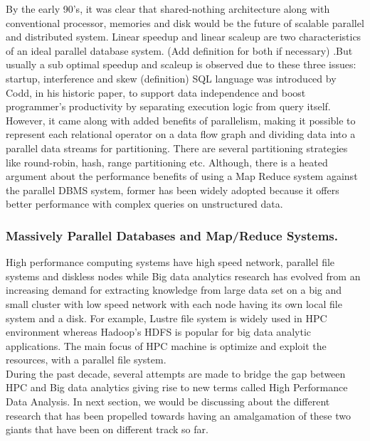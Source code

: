 \documentclass[runningheads,a4paper]{llncs}
\begin{document}
By the early 90's, it was clear that shared-nothing architecture along with conventional processor, memories and disk would be the future of scalable parallel and distributed system. Linear speedup and linear scaleup are two characteristics of an ideal parallel database system. (Add definition for both if necessary) .But usually a sub optimal speedup and scaleup is observed due to these three issues: startup, interference and skew (definition)
SQL language was introduced by Codd, in his historic paper, to support data independence and boost programmer's productivity by separating execution logic from query itself. However, it came along with added benefits of parallelism, making it possible to represent each relational operator on a data flow graph and dividing data into a parallel data streams for partitioning. There are several partitioning strategies like round-robin, hash, range partitioning etc.
Although, there is a heated argument about the performance benefits of using a Map Reduce system against the parallel DBMS system, former has been widely adopted because it offers better performance with complex queries on unstructured data.\\

\subsubsection{Massively Parallel Databases and Map/Reduce Systems.}
High performance computing systems have high speed network, parallel file systems and diskless nodes while Big data analytics research has evolved from an increasing demand for extracting knowledge from large data set on a big and small cluster with low speed network with each node having its own local file system and a disk. For example, Lustre file system is widely used in HPC environment whereas Hadoop's HDFS is popular for big data analytic applications. The main focus of HPC machine is optimize and exploit the resources, with a parallel file system.\\

During the past decade, several attempts are made to bridge the gap between HPC and Big data analytics giving rise to new terms called High Performance Data Analysis. In next section, we would be discussing about the different research that has been propelled towards having an amalgamation of these two giants that have been on different track so far.
\end{document}
